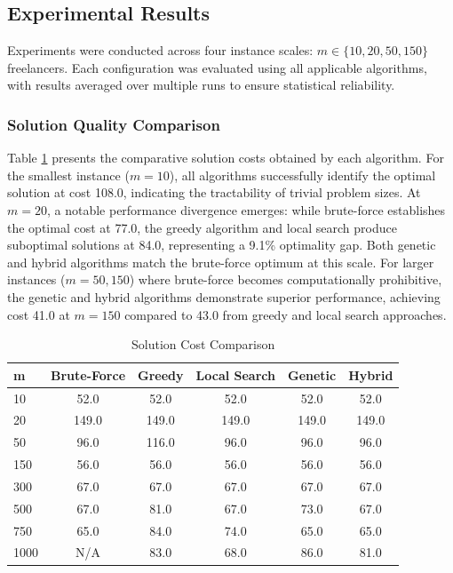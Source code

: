 \documentclass[12pt,a4paper]{article}
\begin{document}
\subsection{Experimental Results}
\label{subsec:experimental-results}

Experiments were conducted across four instance scales: $m \in \{10, 20, 50, 150\}$ freelancers. Each configuration was evaluated using all applicable algorithms, with results averaged over multiple runs to ensure statistical reliability.

\subsubsection{Solution Quality Comparison}

Table \ref{tab:cost-comparison} presents the comparative solution costs obtained by each algorithm. For the smallest instance ($m=10$), all algorithms successfully identify the optimal solution at cost 108.0, indicating the tractability of trivial problem sizes. At $m=20$, a notable performance divergence emerges: while brute-force establishes the optimal cost at 77.0, the greedy algorithm and local search produce suboptimal solutions at 84.0, representing a 9.1\% optimality gap. Both genetic and hybrid algorithms match the brute-force optimum at this scale. For larger instances ($m=50, 150$) where brute-force becomes computationally prohibitive, the genetic and hybrid algorithms demonstrate superior performance, achieving cost 41.0 at $m=150$ compared to 43.0 from greedy and local search approaches.

\begin{table}[H]
	\centering
	\caption{Solution Cost Comparison}
	\label{tab:cost-comparison}
	\begin{tabular}{@{}lccccc@{}}
		\toprule
		\textbf{m} & \textbf{Brute-Force} & \textbf{Greedy} & \textbf{Local Search} & \textbf{Genetic} & \textbf{Hybrid} \\
		\midrule
		10 & 52.0 & 52.0 & 52.0 & 52.0 & 52.0 \\
		20 & 149.0 & 149.0 & 149.0 & 149.0 & 149.0 \\
		50 & 96.0 & 116.0 & 96.0 & 96.0 & 96.0 \\
		150 & 56.0 & 56.0 & 56.0 & 56.0 & 56.0 \\
		300 & 67.0 & 67.0 & 67.0 & 67.0 & 67.0 \\
		500 & 67.0 & 81.0 & 67.0 & 73.0 & 67.0 \\
		750 & 65.0 & 84.0 & 74.0 & 65.0 & 65.0 \\
		1000 & N/A & 83.0 & 68.0 & 86.0 & 81.0 \\
		\bottomrule
	\end{tabular}
\end{table}
\end{document}
